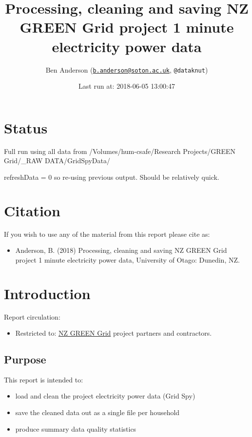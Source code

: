 \documentclass[]{article}
\title{Processing, cleaning and saving NZ GREEN Grid project 1 minute
electricity power data}
\author{Ben Anderson
(\href{mailto:b.anderson@soton.ac.uk}{\nolinkurl{b.anderson@soton.ac.uk}},
\texttt{@dataknut})}
\date{Last run at: 2018-06-05 13:00:47}
\providecommand{\tightlist}{%
  \setlength{\itemsep}{0pt}\setlength{\parskip}{0pt}}
\begin{document}
\maketitle

{
\setcounter{tocdepth}{2}
\tableofcontents
}
\newpage

\section{Status}\label{status}

Full run using all data from /Volumes/hum-csafe/Research Projects/GREEN
Grid/\_RAW DATA/GridSpyData/

refreshData = 0 so re-using previous output. Should be relatively quick.

\section{Citation}\label{citation}

If you wish to use any of the material from this report please cite as:

\begin{itemize}
\tightlist
\item
  Anderson, B. (2018) Processing, cleaning and saving NZ GREEN Grid
  project 1 minute electricity power data, University of Otago: Dunedin,
  NZ.
\end{itemize}

\newpage

\section{Introduction}\label{introduction}

Report circulation:

\begin{itemize}
\tightlist
\item
  Restricted to:
  \href{https://www.otago.ac.nz/centre-sustainability/research/energy/otago050285.html}{NZ
  GREEN Grid} project partners and contractors.
\end{itemize}

\subsection{Purpose}\label{purpose}

This report is intended to:

\begin{itemize}
\tightlist
\item
  load and clean the project electricity power data (Grid Spy)
\item
  save the cleaned data out as a single file per household
\item
  produce summary data quality statistics
\end{itemize}
\end{document}
